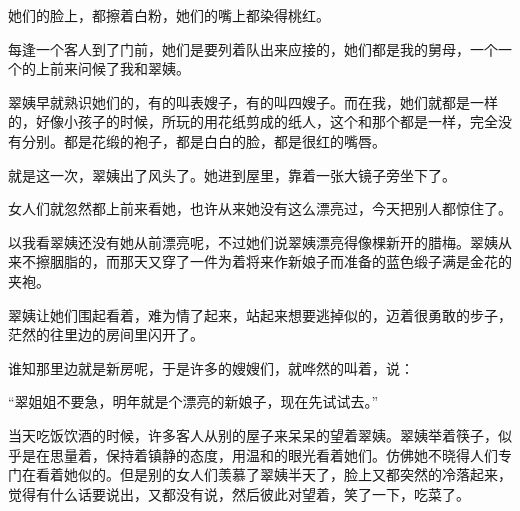 \par 她们的脸上，都擦着白粉，她们的嘴上都染得桃红。
\par 每逢一个客人到了门前，她们是要列着队出来应接的，她们都是我的舅母，一个一个的上前来问候了我和翠姨。
\par 翠姨早就熟识她们的，有的叫表嫂子，有的叫四嫂子。而在我，她们就都是一样的，好像小孩子的时候，所玩的用花纸剪成的纸人，这个和那个都是一样，完全没有分别。都是花缎的袍子，都是白白的脸，都是很红的嘴唇。
\par 就是这一次，翠姨出了风头了。她进到屋里，靠着一张大镜子旁坐下了。
\par 女人们就忽然都上前来看她，也许从来她没有这么漂亮过，今天把别人都惊住了。
\par 以我看翠姨还没有她从前漂亮呢，不过她们说翠姨漂亮得像棵新开的腊梅。翠姨从来不擦胭脂的，而那天又穿了一件为着将来作新娘子而准备的蓝色缎子满是金花的夹袍。
\par 翠姨让她们围起看着，难为情了起来，站起来想要逃掉似的，迈着很勇敢的步子，茫然的往里边的房间里闪开了。
\par 谁知那里边就是新房呢，于是许多的嫂嫂们，就哗然的叫着，说：
\par “翠姐姐不要急，明年就是个漂亮的新娘子，现在先试试去。”
\par 当天吃饭饮酒的时候，许多客人从别的屋子来呆呆的望着翠姨。翠姨举着筷子，似乎是在思量着，保持着镇静的态度，用温和的眼光看着她们。仿佛她不晓得人们专门在看着她似的。但是别的女人们羡慕了翠姨半天了，脸上又都突然的冷落起来，觉得有什么话要说出，又都没有说，然后彼此对望着，笑了一下，吃菜了。
